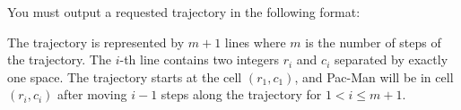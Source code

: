 You must output a requested trajectory in the following format:

The trajectory is represented by $m+1$ lines where $m$ is the number of
steps of the trajectory.
The $i$-th line contains two integers $r_i$ and $c_i$ separated by 
exactly one space.
The trajectory starts at the cell $(r_1,c_1)$, and
Pac-Man will be in cell $(r_i,c_i)$ after moving $i-1$ steps 
along the trajectory for $1<i\le m+1$.
